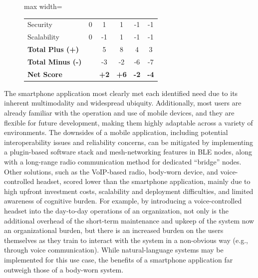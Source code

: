 \documentclass[english,12pt,a4paper,titlepage]{article}
\begin{document}
\begin{figure}[H]
\begin{adjustbox}{max width=\textwidth}
\begin{tabular}{l c c c c c}
				Security & 0 & \cellcolor{green!25}1 & \cellcolor{green!25}1 & \cellcolor{red!25}-1 & \cellcolor{red!25}-1 \\
				Scalability & 0 & \cellcolor{red!25}-1 & \cellcolor{green!25}1 & \cellcolor{red!25}-1 & \cellcolor{red!25}-1 \\
				\midrule
				\textbf{Total Plus (+)} & & 5 & 8 & 4 & 3 \\
				\textbf{Total Minus (-)} & & -3 & -2 & -6 & -7 \\
				\midrule
				\textbf{Net Score} & & \textbf{+2} & \textbf{+6} & \textbf{-2} & \textbf{-4} \\
				\bottomrule
			\end{tabular}
		\end{adjustbox}
	\end{figure}
	The smartphone application most clearly met each identified need due to its inherent multimodality and widespread ubiquity. Additionally, most users are already familiar with the operation and use of mobile devices, and they are flexible for future development, making them highly adaptable across a variety of environments. The downsides of a mobile application, including potential interoperability issues and reliability concerns, can be mitigated by implementing a plugin-based software stack and mesh-networking features in BLE nodes, along with a long-range radio communication method for dedicated “bridge” nodes. Other solutions, such as the VoIP-based radio, body-worn device, and voice-controlled headset, scored lower than the smartphone application, mainly due to high upfront investment costs, scalability and deployment difficulties, and limited awareness of cognitive burden. For example, by introducing a voice-controlled headset into the day-to-day operations of an organization, not only is the additional overhead of the short-term maintenance and upkeep of the system now an organizational burden, but there is an increased burden on the users themselves as they train to interact with the system in a non-obvious way (e.g., through voice communication). While natural-language systems may be implemented for this use case, the benefits of a smartphone application far outweigh those of a body-worn system. 
	
\end{document}
